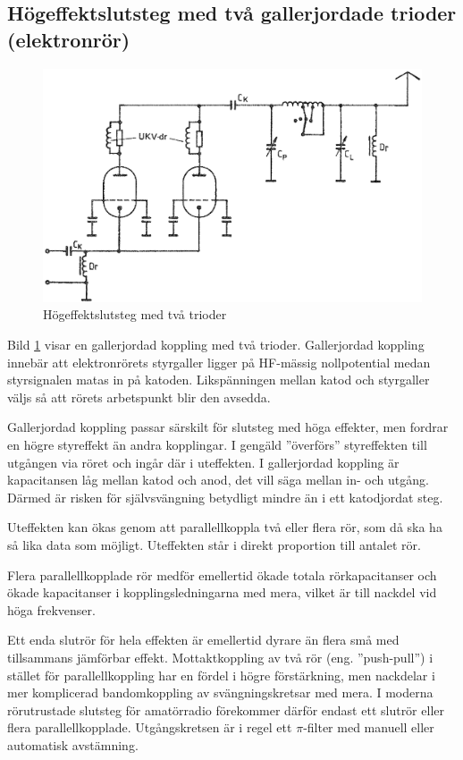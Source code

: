 \subsection{Högeffektslutsteg med två gallerjordade trioder (elektronrör)}

\begin{figure}
\includegraphics[width=\textwidth]{images/cropped_pdfs/bild_2_3-51.pdf}
\caption{Högeffektslutsteg med två trioder}
\label{fig:BildII3-51}
\end{figure}

Bild \ref{fig:BildII3-51} visar en gallerjordad koppling med två trioder.
Gallerjordad koppling innebär att elektronrörets styrgaller ligger på
HF-mässig nollpotential medan styrsignalen matas in på katoden.
Likspänningen mellan katod och styrgaller väljs så att rörets arbetspunkt blir
den avsedda.

Gallerjordad koppling passar särskilt för slutsteg med höga effekter,
men fordrar en högre styreffekt än andra kopplingar.
I gengäld ''överförs'' styreffekten till utgången via röret och ingår där i
uteffekten.
I gallerjordad koppling är kapacitansen låg mellan katod och anod, det vill
säga mellan in- och utgång.
Därmed är risken för självsvängning betydligt mindre än i ett katodjordat steg.

Uteffekten kan ökas genom att parallellkoppla två eller flera rör, som då ska
ha så lika data som möjligt.
Uteffekten står i direkt proportion till antalet rör.

Flera parallellkopplade rör medför emellertid ökade totala rörkapacitanser och 
ökade kapacitanser i kopplingsledningarna med mera, vilket är till nackdel vid
höga frekvenser.

Ett enda slutrör för hela effekten är emellertid dyrare än flera små med
tillsammans jämförbar effekt.
Mottaktkoppling av två rör (eng. ''push-pull'') i stället för parallellkoppling
har en fördel i högre förstärkning, men nackdelar i mer komplicerad
bandomkoppling av svängningskretsar med mera.
I moderna rörutrustade slutsteg för amatörradio förekommer därför endast ett
slutrör eller flera parallellkopplade.
Utgångskretsen är i regel ett \(\pi \)-filter med manuell eller automatisk
avstämning.

